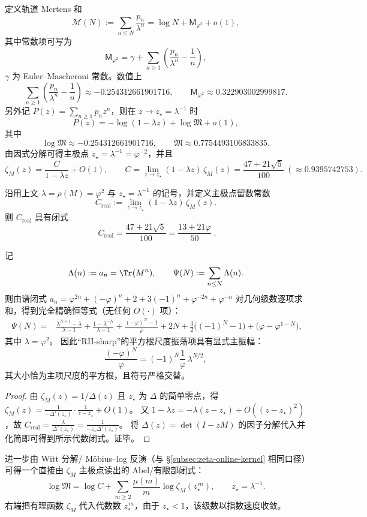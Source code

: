定义轨道 Mertens 和
\[
\mathcal{M}(N):=\sum_{n\le N}\frac{p_n}{\lambda^n}
=\log N+\mathsf{M}_{\varphi^2}+o(1),
\]
其中常数项可写为
\[
\mathsf{M}_{\varphi^2}
=\gamma+\sum_{n\ge 1}\left(\frac{p_n}{\lambda^n}-\frac{1}{n}\right),
\]
$\gamma$ 为 Euler--Mascheroni 常数。数值上
\[
\sum_{n\ge 1}\left(\frac{p_n}{\lambda^n}-\frac{1}{n}\right)\approx -0.254312661901716,
\qquad
\mathsf{M}_{\varphi^2}\approx 0.322903002999817.
\]
另外记 $P(z)=\sum_{n\ge 1}p_n z^n$，则在 $z\to z_\star=\lambda^{-1}$ 时
\[
P(z)=-\log(1-\lambda z)+\log\mathfrak{M}+o(1),
\]
其中
\[
\log\mathfrak{M}\approx -0.254312661901716,\qquad
\mathfrak{M}\approx 0.7754493106833835.
\]
由因式分解可得主极点 $z_\star=\lambda^{-1}=\varphi^{-2}$，并且
\[
\zeta_M(z)=\frac{C}{1-\lambda z}+O(1),\qquad
C=\lim_{z\to z_\star}(1-\lambda z)\,\zeta_M(z)=\frac{47+21\sqrt5}{100}\ (\approx 0.9395742753).
\]

\begin{proposition}\label{prop:real-input-40-residue-constant}
沿用上文 \(\lambda=\rho(M)=\varphi^2\) 与 \(z_\star=\lambda^{-1}\) 的记号，并定义主极点留数常数
\[
C_{\mathrm{real}}:=\lim_{z\to z_\star}(1-\lambda z)\,\zeta_M(z).
\]
则 \(C_{\mathrm{real}}\) 具有闭式
\[
\boxed{\;
C_{\mathrm{real}}=\frac{47+21\sqrt5}{100}=\frac{13+21\varphi}{50}\; }.
\]
\end{proposition}

\begin{corollary}\label{cor:real-input-40-chebyshev-explicit}
记
\[
\Lambda(n):=a_n=\Tr(M^n),
\qquad
\Psi(N):=\sum_{n\le N}\Lambda(n).
\]
则由谱闭式
\(
a_n=\varphi^{2n}+(-\varphi)^n+2+3(-1)^n+\varphi^{-2n}+\varphi^{-n}
\)
对几何级数逐项求和，得到完全精确恒等式（无任何 \(O(\cdot)\) 项）：
\[
\boxed{\;
\begin{aligned}
\Psi(N)
={}&\frac{\lambda^{N+1}-\lambda}{\lambda-1}
+\frac{1-\lambda^{-N}}{\lambda-1}
+\frac{(-\varphi)^N-1}{\varphi}
+2N+\frac{3}{2}\bigl((-1)^N-1\bigr)
+\bigl(\varphi-\varphi^{1-N}\bigr),
\end{aligned}}
\]
其中 \(\lambda=\varphi^2\)。
因此“RH-sharp”的平方根尺度振荡项具有显式主振幅：
\[
\frac{(-\varphi)^N}{\varphi}=(-1)^N\frac{1}{\varphi}\,\lambda^{N/2},
\]
其大小恰为主项尺度的平方根，且符号严格交替。
\end{corollary}
\begin{proof}
由 \(\zeta_M(z)=1/\Delta(z)\) 且 \(z_\star\) 为 \(\Delta\) 的简单零点，得
\(
\zeta_M(z)=\frac{1}{-\Delta'(z_\star)}\cdot\frac{1}{z-z_\star}+O(1)
\)。
又 \(1-\lambda z=-\lambda(z-z_\star)+O((z-z_\star)^2)\)，故
\(
C_{\mathrm{real}}=\frac{\lambda}{\Delta'(z_\star)}=\frac{1}{-z_\star\Delta'(z_\star)}
\)。
将 \(\Delta(z)=\det(I-zM)\) 的因子分解代入并化简即可得到所示代数闭式。证毕。
\end{proof}
进一步由 Witt 分解/ Möbius--log 反演（与 \S\ref{subsec:zeta-online-kernel} 相同口径）可得一个直接由 $\zeta_M$ 主极点读出的 Abel/有限部闭式：
\[
\log\mathfrak{M}
=\log C+\sum_{m\ge 2}\frac{\mu(m)}{m}\log\zeta_M(z_\star^{\,m}),
\qquad z_\star=\lambda^{-1}.
\]
右端把有理函数 $\zeta_M$ 代入代数数 $z_\star^{\,m}$，由于 $z_\star<1$，该级数以指数速度收敛。

